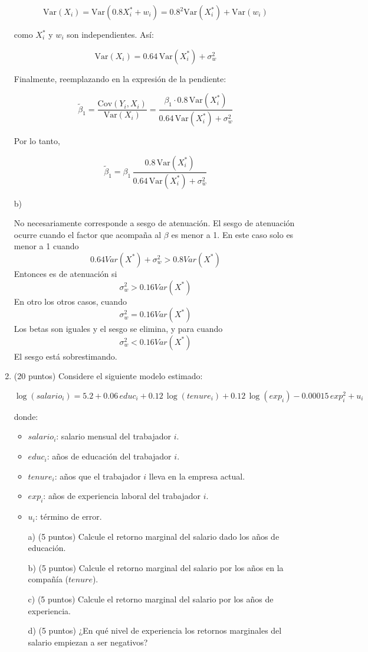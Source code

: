 \documentclass[10pt,a4paper]{article}
\begin{document}
\begin{enumerate}
\[
\mathrm{Var}(X_i)
=
\mathrm{Var}(0.8X_i^* + w_i)
=
0.8^2\mathrm{Var}(X_i^*) + \mathrm{Var}(w_i)
\]

como \(X_i^*\) y \(w_i\) son independientes. Así:

\[
\mathrm{Var}(X_i)=0.64\,\mathrm{Var}(X_i^*)+\sigma_w^2
\]

Finalmente, reemplazando en la expresión de la pendiente:

\[
\tilde{\beta}_1
=
\frac{\mathrm{Cov}(Y_i,X_i)}{\mathrm{Var}(X_i)}
=
\frac{\beta_1 \cdot 0.8\,\mathrm{Var}(X_i^*)}{0.64\,\mathrm{Var}(X_i^*)+\sigma_w^2}
\]

Por lo tanto,

\[
\boxed{
\tilde{\beta}_1
=
\beta_1\,
\frac{0.8\,\mathrm{Var}(X_i^*)}{0.64\,\mathrm{Var}(X_i^*)+\sigma_w^2}
}
\]

b)

No necesariamente corresponde a sesgo de atenuación. El sesgo de atenuación ocurre cuando el factor que acompaña al $\beta$ es menor a 1. En este caso solo es menor a 1 cuando 
$$0.64Var(X^*)+\sigma^2_w > 0.8Var(X^*)$$
Entonces es de atenuación si
$$\sigma^2_w>0.16Var(X^*)$$
En otro los otros casos, cuando 
$$\sigma^2_w=0.16Var(X^*)$$
Los  betas son iguales y el sesgo se elimina, y para cuando
$$\sigma^2_w<0.16Var(X^*)$$
El sesgo está sobrestimando. 

    \item (20 puntos) Considere el siguiente modelo estimado:

\[
\log(salario_i)= 5.2 + 0.06\,educ_i + 0.12\,\log(tenure_i) + 0.12\,\log(exp_i) - 0.00015\,exp_i^2 + u_i
\]

donde:

\begin{itemize}
    \item $salario_i$: salario mensual del trabajador $i$.
    \item $educ_i$: años de educación del trabajador $i$.
    \item $tenure_i$: años que el trabajador $i$ lleva en la empresa actual.
    \item $exp_i$: años de experiencia laboral del trabajador $i$.
    \item $u_i$: término de error.
\end{itemize}


\begin{enumerate}
    \item[a)] (5 puntos) Calcule el retorno marginal del salario dado los años de educación.
    \item[b)] (5 puntos) Calcule el retorno marginal del salario por los años en la compañía ($tenure$).
    \item[c)] (5 puntos) Calcule el retorno marginal del salario por los años de experiencia.
    \item[d)] (5 puntos) ¿En qué nivel de experiencia los retornos marginales del salario empiezan a ser negativos?
\end{enumerate}


\end{enumerate}
\end{document}
